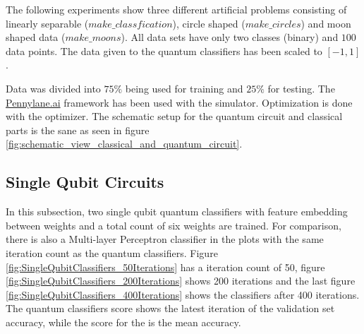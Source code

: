 The following experiments show three different artificial problems consisting of linearly separable ($make\_classfication$), circle shaped ($make\_circles$) and moon shaped data ($make\_moons$). All data sets have only two classes (binary) and $100$ data points. The data given to the quantum classifiers has been scaled to $\mathrm{[-1,1]}$. 

Data was divided into $75\%$ being used for training and $25\%$ for testing. The \href{https://www.pennylane.ai}{Pennylane.ai} framework has been used with the \href{https://pennylane.readthedocs.io/en/stable/code/api/pennylane.devices.default_qubit.html#module-pennylane.devices.default_qubit}{} simulator. Optimization is done with the \href{https://pennylane.readthedocs.io/en/stable/code/api/pennylane.NesterovMomentumOptimizer.html}{} optimizer. The schematic setup for the quantum circuit and classical parts is the sane as seen in figure \ref{fig:schematic_view_classical_and_quantum_circuit}. 

\clearpage
\subsection{Single Qubit Circuits}
\label{subsection:single_qubit_circuits}

In this subsection, two single qubit quantum classifiers with feature embedding between weights and a total count of six weights are trained. For comparison, there is also a Multi-layer Perceptron classifier in the plots with the same iteration count as the quantum classifiers. Figure \ref{fig:SingleQubitClassifiers_50Iterations} has a iteration count of 50, figure \ref{fig:SingleQubitClassifiers_200Iterations} shows 200 iterations and the last figure \ref{fig:SingleQubitClassifiers_400Iterations} shows the classifiers after 400 iterations. The quantum classifiers score shows the latest iteration of the validation set accuracy, while the score for the  is the mean accuracy.\\
\\

